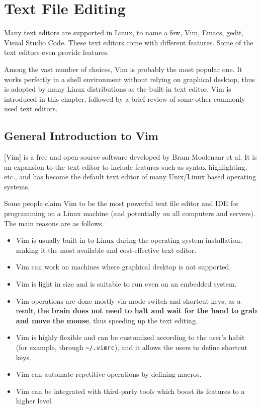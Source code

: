 \chapter{Text File Editing} \label{ch:tfe}

Many text editors are supported in Linux, to name a few, Vim, Emacs, gedit, Visual Studio Code. These text editors come with different features. Some of the text editors even provide  features.

Among the vast number of choices, Vim is probably the most popular one. It works perfectly in a shell environment without relying on graphical desktop, thus is adopted by many Linux distributions as the built-in text editor. Vim is introduced in this chapter, followed by a brief review of some other commonly used text editors.

\section{General Introduction to Vim}

[Vim] is a free and open-source software developed by Bram Moolenaar et al. It is an expansion to the  text editor to include features such as syntax highlighting, etc., and has become the default text editor of many Unix/Linux based operating systems.

Some people claim Vim to be the most powerful text file editor and IDE for programming on a Linux machine (and potentially on all computers and servers). The main reasons are as follows.
\begin{itemize}
  \item Vim is usually built-in to Linux during the operating system installation, making it the most available and cost-effective text editor.
  \item Vim can work on machines where graphical desktop is not supported.
  \item Vim is light in size and is suitable to run even on an embedded system.
  \item Vim operations are done mostly via mode switch and shortcut keys; as a result, \textbf{the brain does not need to halt and wait for the hand to grab and move the mouse}, thus speeding up the text editing.
  \item Vim is highly flexible and can be customized according to the user's habit (for example, through \verb|~/.vimrc|), and it allows the users to define shortcut keys.
  \item Vim can automate repetitive operations by defining macros.
  \item Vim can be integrated with third-party tools which boost its features to a higher level.
\end{itemize}

